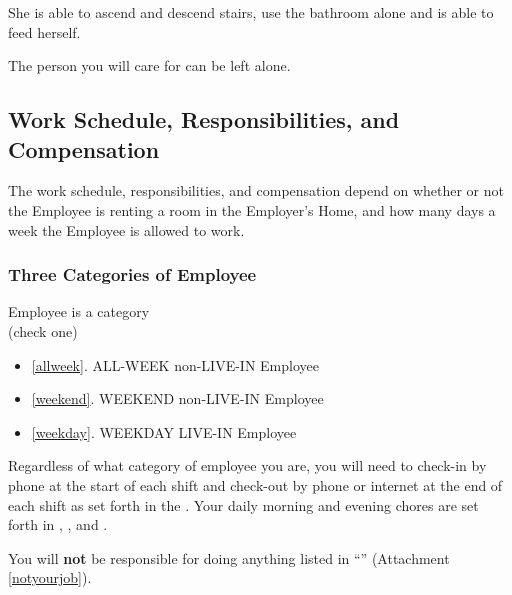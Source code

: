 \documentclass[]{article}
\newcommand{\checkbox}{\raisebox{2pt}{\framebox[12pt][c]{\rule[7pt]{0pt}{-.3\baselineskip}}}}
\newcommand{\allweek}{ALL-WEEK non-LIVE-IN Employee}
\newcommand{\weekend}{WEEKEND non-LIVE-IN Employee}
\newcommand{\weekday}{WEEKDAY LIVE-IN Employee}
\begin{document}


She is able to ascend and descend stairs, use the bathroom alone and is able to feed herself.

The person you will care for can be left alone.

\subsection*{Work Schedule, Responsibilities, and Compensation}
The work schedule, responsibilities, and compensation depend on whether or not the Employee is renting a room in the Employer's Home, and how many days a week the Employee is allowed to work.
\subsubsection*{Three Categories of Employee}

\noindent Employee is a category\\
\noindent(check one)
\begin{itemize}
	\item[\checkbox] \ref{allweek}. \allweek{}
	\item[\checkbox] \ref{weekend}. \weekend{}
	\item[\checkbox] \ref{weekday}. \weekday{}
\end{itemize}

Regardless of what category of employee you are, you will need to check-in by phone at the start of each shift and check-out by phone or internet at the end of each shift as set forth in the \basic{}. Your daily morning and evening chores are set forth in \basic{}, \bathroom{}, and \shopping{}. 

You will \textbf{not} be responsible for doing anything listed in ``\notyourjob{}'' (Attachment \ref{notyourjob}). 
\end{document}
